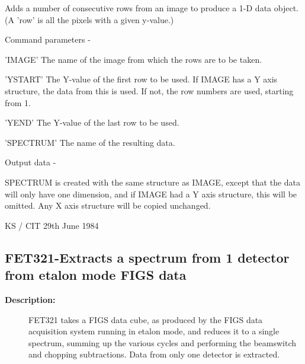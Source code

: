 \begin{description}
\begin{description}
\begin{terminalv}
 Adds a number of consecutive rows from an image to
 produce a 1-D data object.  (A 'row' is all the
 pixels with a given y-value.)

 Command parameters -

 'IMAGE'    The name of the image from which the rows
            are to be taken.

 'YSTART'   The Y-value of the first row to be used.
            If IMAGE has a Y axis structure, the data from this
            is used.  If not, the row numbers are used,
            starting from 1.

 'YEND'     The Y-value of the last row to be used.

 'SPECTRUM' The name of the resulting data.

 Output data -

 SPECTRUM is created with the same structure as IMAGE,
 except that the data will only have one dimension, and if
 IMAGE had a Y axis structure, this will be omitted.  Any X
 axis structure will be copied unchanged.

                                 KS / CIT 29th June 1984
\end{terminalv}
\end{description}
\subsection{FET321-\label{FET321}Extracts a spectrum from 1 detector from etalon mode FIGS data}
\begin{description}

\item [\textbf{Description:}]
 FET321 takes a FIGS data cube, as produced by the FIGS data
 acquisition system running in etalon mode, and reduces it to a
 single spectrum, summing up the various cycles and performing the
 beamswitch and chopping subtractions.  Data from only one detector
 is extracted.


\end{description}
\end{description}
